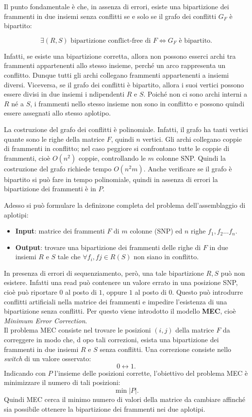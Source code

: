 Il punto fondamentale è che, in assenza di errori, esiste una bipartizione dei frammenti in due insiemi senza conflitti se e solo se il grafo dei conflitti \(G_F\) è bipartito:

\[
\exists (R,S) \text{ bipartizione conflict-free di } F
\iff
G_F \text{ è bipartito}.
\]

Infatti, se esiste una bipartizione corretta, allora non possono esserci archi tra frammenti appartenenti allo stesso insieme, perché un arco rappresenta un conflitto. 
Dunque tutti gli archi collegano frammenti appartenenti a insiemi diversi.
Viceversa, se il grafo dei conflitti è bipartito, allora i suoi vertici possono essere divisi in due insiemi i
ndipendenti \(R\) e \(S\). Poiché non ci sono archi interni a \(R\) né a \(S\), 
i frammenti nello stesso insieme non sono in conflitto e possono quindi essere assegnati allo stesso aplotipo.

La costruzione del grafo dei conflitti è polinomiale. Infatti, il grafo ha tanti vertici quante sono le righe della 
matrice \(F\), quindi \(n\) vertici. Gli archi collegano coppie di frammenti in conflitto; nel caso peggiore 
si confrontano tutte le coppie di frammenti, cioè \(O(n^2)\) coppie, controllando le \(m\) colonne SNP. 
Quindi la costruzione del grafo richiede tempo \(O(n^2m)\). Anche verificare se il grafo è bipartito 
si può fare in tempo polinomiale, quindi in assenza di errori la bipartizione dei frammenti è in \(P\).

Adesso si può formulare la definizone completa del problema dell'assemblaggio di aplotipi:
\begin{itemize}
    \item \textbf{Input}: matrice dei frammenti \(F\) di $m$ colonne (SNP) ed $n$ righe $f_1,f_2 \dots f_n$.
    \item \textbf{Output}: trovare una bipartizione dei frammenti delle righe di \(F\) in due insiemi \(R\) e \(S\) tale che $\forall f_i, fj \in R (S)$ non siano in conflitto.
\end{itemize}

In presenza di errori di sequenziamento, però, una tale bipartizione \(R,S\) può non esistere. 
Infatti una read può contenere un valore errato in una posizione SNP, cioè può riportare \(0\) al posto di \(1\), 
oppure \(1\) al posto di \(0\). Questo può introdurre conflitti artificiali nella matrice dei frammenti e impedire 
l'esistenza di una bipartizione senza conflitti. Per questo viene introdotto il modello \textbf{MEC}, 
cioè \emph{Minimum Error Correction}.
\\
Il problema MEC consiste nel trovare le posizioni \((i,j)\) della matrice \(F\) da correggere in modo che, d
opo tali correzioni, esista una bipartizione dei frammenti in due insiemi \(R\) e \(S\) senza conflitti. 
Una correzione consiste nello \emph{switch} di un valore osservato:
\[
0 \leftrightarrow 1.
\]
Indicando con \(P\) l'insieme delle posizioni corrette, l'obiettivo del problema MEC è minimizzare il numero di tali posizioni:
\[
\min |P|.
\]
Quindi MEC cerca il minimo numero di valori della matrice da cambiare affinché sia possibile ottenere la 
bipartizione dei frammenti nei due aplotipi.

